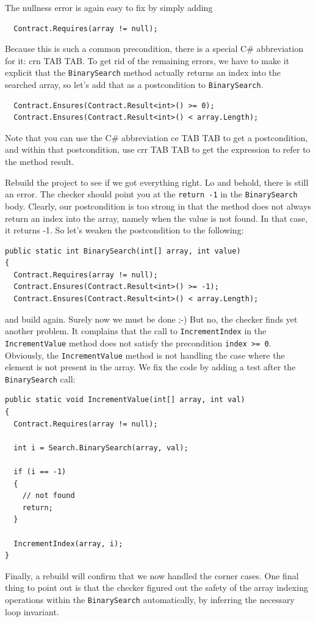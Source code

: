 \documentclass{article}
\newcommand{\code}[1]{\lstinline{#1}}
\begin{document}
The nullness error is again easy to fix by simply adding
\begin{lstlisting}
  Contract.Requires(array != null);
\end{lstlisting}
Because this is such a common precondition, there is a special C\#
abbreviation for it: \textsf{crn TAB TAB}. To get rid of the remaining
errors, we have to make it explicit that the \code{BinarySearch}
method actually returns an index into the searched array, so let's add
that as a postcondition to \code{BinarySearch}.
\begin{lstlisting}
  Contract.Ensures(Contract.Result<int>() >= 0);
  Contract.Ensures(Contract.Result<int>() < array.Length);
\end{lstlisting}
Note that you can use the C\# abbreviation \textsf{ce TAB TAB} to get
a postcondition, and within that postcondition, use \textsf{crr TAB
  TAB} to get the expression to refer to the method result.

Rebuild the project to see if we got everything right. Lo and behold,
there is still an error. The checker should point you at the
\code{return -1} in the \code{BinarySearch} body. Clearly, our
postcondition is too strong in that the method does not always return
an index into the array, namely when the value is not found. In that
case, it returns -1. So let's weaken the postcondition to the
following:
\begin{lstlisting}
public static int BinarySearch(int[] array, int value)
{
  Contract.Requires(array != null);
  Contract.Ensures(Contract.Result<int>() >= -1);
  Contract.Ensures(Contract.Result<int>() < array.Length);
\end{lstlisting}
and build again. Surely now we must be done ;-) But no, the checker
finds yet another problem. It complains that the call to
\code{IncrementIndex} in the \code{IncrementValue} method does not
satisfy the precondition \code{index >= 0}. Obviously, the
\code{IncrementValue} method is not handling the case where the
element is not present in the array. We fix the code by adding a test
after the \code{BinarySearch} call:
\begin{lstlisting}
public static void IncrementValue(int[] array, int val)
{
  Contract.Requires(array != null);
  
  int i = Search.BinarySearch(array, val);

  if (i == -1)
  {
    // not found
    return;
  }

  IncrementIndex(array, i);
}
\end{lstlisting}
Finally, a rebuild will confirm that we now handled the corner
cases. One final thing to point out is that the checker figured out
the safety of the array indexing operations within the
\code{BinarySearch} automatically, by inferring the necessary loop
invariant.
\end{document}
